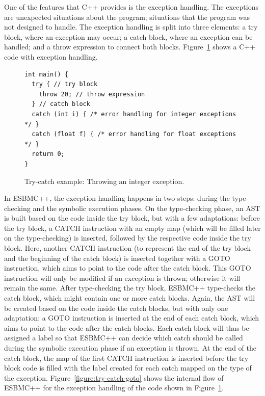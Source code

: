 \documentclass[a4paper]{llncs}
\begin{document}
One of the features that C++ provides is the exception handling. 
The exceptions are unexpected situations about the program; situations
that the program was not designed to handle. The exception handling 
is split into three elements: a try block, where an exception may occur; 
a catch block, where an exception can be handled; and a throw 
expression to connect both blocks. Figure~\ref{figure:try-catch-example} 
shows a C++ code with exception handling.
%
\begin{figure}[ht]
\centering
\begin{minipage}{1.0\textwidth}
\begin{lstlisting}
int main() {
  try { // try block
    throw 20; // throw expression
  } // catch block
  catch (int i) { /* error handling for integer exceptions */ }
  catch (float f) { /* error handling for float exceptions */ }
  return 0;
}
\end{lstlisting}
\end{minipage}
\caption{Try-catch example: Throwing an integer exception.} \vspace*{-4ex}
\label{figure:try-catch-example}
\end{figure}

In ESBMC++, the exception handling happens in two steps:
during the type-checking and the symbolic execution phases.
On the type-checking phase, an AST is built based on the code
inside the try block, but with a few adaptations: before the try block, 
a CATCH instruction with an empty map (which will be filled later on 
the type-checking) is inserted, followed by the respective code inside 
the try block. Here, another CATCH instruction (to represent the end of the 
try block and the beginning of the catch block) is inserted together with 
a GOTO instruction, which aims to point to the code after the catch block. 
This GOTO instruction will only be modified if an exception is thrown;
otherwise it will remain the same. After type-checking the try block,
ESBMC++ type-checks the catch block, which might contain one or more catch blocks.
Again, the AST will be created based on the code inside the catch blocks, but
with only one adaptation: a GOTO instruction is inserted at the end of
each catch block, which aims to point to the code after the catch blocks. Each catch block
will thus be assigned a label so that ESBMC++ can decide which catch should be called
during the symbolic execution phase if an exception is thrown. At the end
of the catch block, the map of the first CATCH instruction is
inserted before the try block code is filled with the label created
for each catch mapped on the type of the exception. Figure~\ref{figure:try-catch-goto}
shows the internal flow of ESBMC++ for the exception handling of the code shown in
Figure~\ref{figure:try-catch-example}.
\end{document}
